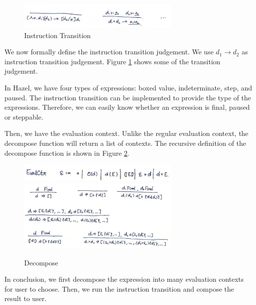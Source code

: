 \begin{figure}[htbp]
  \centering
  \includegraphics[width=0.7\textwidth]{instr_trans.png}
  \caption{Instruction Transition}
  \label{fig:instr_trans}
\end{figure}

We now formally define the instruction transition judgement. We use $d_1 \to d_2$ as instruction transition judgement. Figure \ref{fig:instr_trans} shows some of the transition judgement.

In Hazel, we have four types of expressions: boxed value, indeterminate, step, and paused. The instruction transition can be implemented to provide the type of the expressions. Therefore, we can easily know whether an expression is final, paused or steppable. %

Then, we have the evaluation context. Unlike the regular evaluation context, the decompose function will return a list of contexts. The recursive definition of the decompose function is shown in Figure \ref{fig:decompose}.

\begin{figure}[htbp]
  \centering
  \includegraphics[width=0.7\textwidth]{context.png}
  \includegraphics[width=0.7\textwidth]{decompose.png}
  \caption{Decompose}
  \label{fig:decompose}
\end{figure}

In conclusion, we first decompose the expression into many evaluation contexts for user to choose. Then, we run the instruction transition and compose the result to user. 